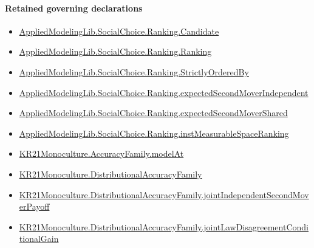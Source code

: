 \documentclass[10pt]{article}
\begin{document}
\paragraph{Retained governing declarations}
\begin{itemize}\raggedright
\item \hyperlink{library-prerequisite-8c0e6c25845ae78a}{Applied\allowbreak{}Modeling\allowbreak{}Lib.\allowbreak{}Social\allowbreak{}Choice.\allowbreak{}Ranking.\allowbreak{}Candidate}
\item \hyperlink{library-prerequisite-5cde54446d1ae021}{Applied\allowbreak{}Modeling\allowbreak{}Lib.\allowbreak{}Social\allowbreak{}Choice.\allowbreak{}Ranking.\allowbreak{}Ranking}
\item \hyperlink{library-prerequisite-3585717d1635654a}{Applied\allowbreak{}Modeling\allowbreak{}Lib.\allowbreak{}Social\allowbreak{}Choice.\allowbreak{}Ranking.\allowbreak{}Strictly\allowbreak{}Ordered\allowbreak{}By}
\item \hyperlink{governing-declaration-4f697449f42135d1}{Applied\allowbreak{}Modeling\allowbreak{}Lib.\allowbreak{}Social\allowbreak{}Choice.\allowbreak{}Ranking.\allowbreak{}expected\allowbreak{}Second\allowbreak{}Mover\allowbreak{}Independent}
\item \hyperlink{governing-declaration-864c9bb19be5af0d}{Applied\allowbreak{}Modeling\allowbreak{}Lib.\allowbreak{}Social\allowbreak{}Choice.\allowbreak{}Ranking.\allowbreak{}expected\allowbreak{}Second\allowbreak{}Mover\allowbreak{}Shared}
\item \hyperlink{governing-declaration-30ca9c740ef703ec}{Applied\allowbreak{}Modeling\allowbreak{}Lib.\allowbreak{}Social\allowbreak{}Choice.\allowbreak{}Ranking.\allowbreak{}inst\allowbreak{}Measurable\allowbreak{}Space\allowbreak{}Ranking}
\item \hyperlink{governing-declaration-869d6f3944f2bc91}{KR21\allowbreak{}Monoculture.\allowbreak{}Accuracy\allowbreak{}Family.\allowbreak{}model\allowbreak{}At}
\item \hyperlink{paper-prerequisite-ee564fa2921e1add}{KR21\allowbreak{}Monoculture.\allowbreak{}Distributional\allowbreak{}Accuracy\allowbreak{}Family}
\item \hyperlink{governing-declaration-e9ffafacdfd323b7}{KR21\allowbreak{}Monoculture.\allowbreak{}Distributional\allowbreak{}Accuracy\allowbreak{}Family.\allowbreak{}joint\allowbreak{}Independent\allowbreak{}Second\allowbreak{}Mover\allowbreak{}Payoff}
\item \hyperlink{governing-declaration-5f78b77446d99d4c}{KR21\allowbreak{}Monoculture.\allowbreak{}Distributional\allowbreak{}Accuracy\allowbreak{}Family.\allowbreak{}joint\allowbreak{}Law\allowbreak{}Disagreement\allowbreak{}Conditional\allowbreak{}Gain}

\end{itemize}
\end{document}
